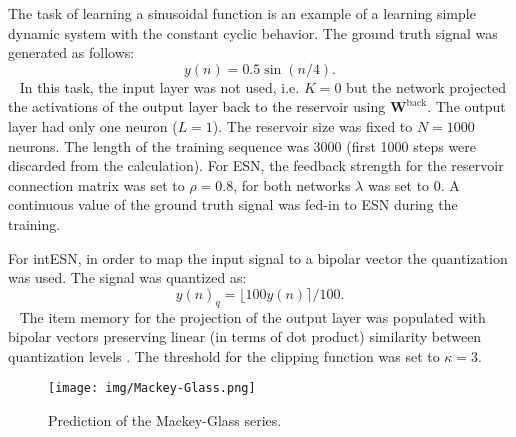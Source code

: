 The task of learning a sinusoidal function \cite{ESN02} is
an example of a learning  simple dynamic system with the constant cyclic behavior. The 
ground truth signal was generated as follows:
~
\begin{equation}
y(n)=0.5\sin(n/4).
\label{eq:sin}
 \end{equation}
~
In this task, the input layer was not used, i.e. $K=0$ but the network
projected the activations  of the output layer back to the reservoir using $\textbf{W}^{\text{back}}$. The output
layer had only one neuron ($L=1$).  The reservoir size was fixed to $N=1000$ neurons.
The length of the training  sequence was 3000 (first 1000 steps were discarded
from the calculation). For ESN, the feedback strength for the reservoir connection matrix was set to $\rho=0.8$,
for both networks  $\lambda$ was set to 0.
A continuous value of the ground truth signal was fed-in to ESN during the training. 

For  intESN, in order to map the input signal to a bipolar vector the quantization was used. The signal was quantized as:
~
\begin{equation}
y(n)_q=\lfloor100y(n)\rceil/100.
\label{eq:quan}
 \end{equation}
~
The item memory for the projection of the output layer was populated with
bipolar vectors preserving linear  (in terms of dot product) similarity between
quantization levels \cite{Widdows15}.  The threshold for the clipping function
was set to $\kappa=3$.
 

\begin{figure*}[tb]%
\centering
\texttt{[image: img/Mackey-Glass.png]}
\caption{Prediction of the Mackey-Glass series.}
\label{fig:Mackey-Glass}
\end{figure*}


